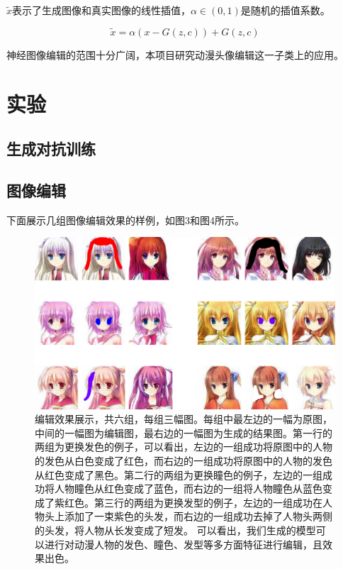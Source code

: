 \documentclass[a4paper,12pt,UTF8]{ctexart}
\newcommand{\kai}{\CJKfamily{zhkai}}	%
\begin{document}
$\tilde x$表示了生成图像和真实图像的线性插值，$\alpha \in (0, 1)$是随机的插值系数。

\begin{equation}
  \tilde x = \alpha (x - G(z, c)) + G(z, c)
\end{equation}


神经图像编辑的范围十分广阔，本项目研究动漫头像编辑这一子类上的应用。

\section{实验}

\subsection{生成对抗训练}






\subsection{图像编辑}

%

下面展示几组图像编辑效果的样例，如图3和图4所示。

\begin{figure}[H]
  \centering
  \includegraphics[width=0.9\linewidth]{figs/pic.pdf}
  \caption{\kai 编辑效果展示，共六组，每组三幅图。每组中最左边的一幅为原图，中间的一幅图为编辑图，最右边的一幅图为生成的结果图。第一行的两组为更换发色的例子，可以看出，左边的一组成功将原图中的人物的发色从白色变成了红色，而右边的一组成功将原图中的人物的发色从红色变成了黑色。第二行的两组为更换瞳色的例子，左边的一组成功将人物瞳色从红色变成了蓝色，而右边的一组将人物瞳色从蓝色变成了紫红色。第三行的两组为更换发型的例子，左边的一组成功在人物头上添加了一束紫色的头发，而右边的一组成功去掉了人物头两侧的头发，将人物从长发变成了短发。
  可以看出，我们生成的模型可以进行对动漫人物的发色、瞳色、发型等多方面特征进行编辑，且效果出色。}
  \label{fig:pic}
\end{figure}
\end{document}
